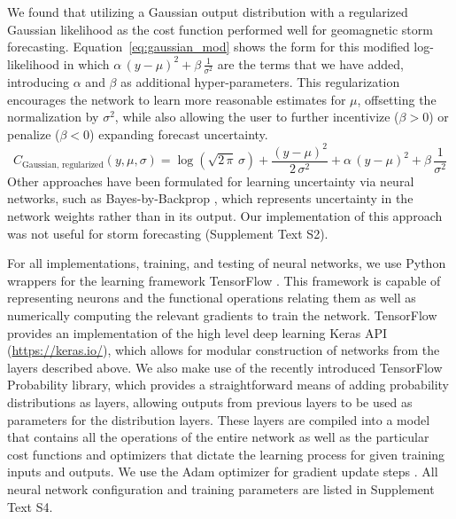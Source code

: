 We found that utilizing a Gaussian output distribution with a regularized Gaussian likelihood as the cost function performed well for geomagnetic storm forecasting. Equation~\ref{eq:gaussian_mod} shows the form for this modified log-likelihood in which $\alpha\,(y-\mu)^2 + \beta\,\frac{1}{\sigma^2}$ are the terms that we have added, introducing $\alpha$ and $\beta$ as additional hyper-parameters. This regularization encourages the network to learn more reasonable estimates for $\mu$, offsetting the normalization by $\sigma^2$, while also allowing the user to further incentivize ($\beta > 0$) or penalize ($\beta < 0$) expanding forecast uncertainty.
\begin{equation}
    C_{\mathrm{Gaussian,\, regularized}}(y, \mu, \sigma) = \log\left(\sqrt{2\,\pi}\,\sigma \right) + \frac{\left(y-\mu \right)^2}{2\,\sigma^2} +  \alpha\,\left(y-\mu \right)^2 + \beta\,\frac{1}{\sigma^2} \label{eq:gaussian_mod}
\end{equation}
Other approaches have been formulated for learning uncertainty via neural networks, such as Bayes-by-Backprop \citep{Blundell2015}, which represents uncertainty in the network weights rather than in its output. Our implementation of this approach was not useful for storm forecasting (Supplement Text S2).

For all implementations, training, and testing of neural networks, we use Python wrappers for the learning framework TensorFlow \citep{tensorflow}. This framework is capable of representing neurons and the functional operations relating them as well as numerically computing the relevant gradients to train the network. TensorFlow provides an implementation of the high level deep learning Keras API (\url{https://keras.io/}), which allows for modular construction of networks from the layers described above. We also make use of the recently introduced TensorFlow Probability library, which provides a straightforward means of adding probability distributions as layers, allowing outputs from previous layers to be used as parameters for the distribution layers. These layers are compiled into a model that contains all the operations of the entire network as well as the particular cost functions and optimizers that dictate the learning process for given training inputs and outputs. We use the Adam optimizer for gradient update steps \citep{Kingma2014adam}. All neural network configuration and training parameters are listed in Supplement Text S4.


